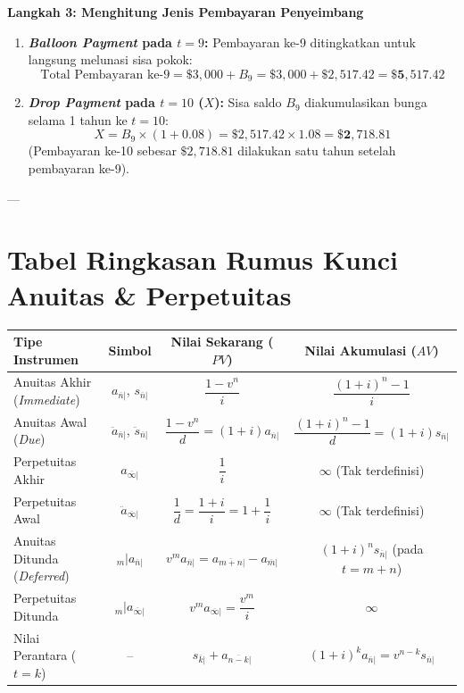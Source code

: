 \documentclass[11pt,a4paper]{article}
\begin{document}
\begin{examplebox}
\textbf{Langkah 3: Menghitung Jenis Pembayaran Penyeimbang}
\begin{enumerate}[label=(\alph*)]
    \item \textbf{\textit{Balloon Payment} pada $t = 9$:}
    Pembayaran ke-9 ditingkatkan untuk langsung melunasi sisa pokok:
    \begin{equation*}
        \text{Total Pembayaran ke-9} = \$3{,}000 + B_9 = \$3{,}000 + \$2{,}517.42 = \mathbf{\$5{,}517.42}
    \end{equation*}

    \item \textbf{\textit{Drop Payment} pada $t = 10$ ($X$):}
    Sisa saldo $B_9$ diakumulasikan bunga selama 1 tahun ke $t = 10$:
    \begin{equation*}
        X = B_9 \times (1 + 0.08) = \$2{,}517.42 \times 1.08 = \mathbf{\$2{,}718.81}
    \end{equation*}
    (Pembayaran ke-10 sebesar $\$2{,}718.81$ dilakukan satu tahun setelah pembayaran ke-9).
\end{enumerate}
\end{examplebox}

---

\section{Tabel Ringkasan Rumus Kunci Anuitas \& Perpetuitas}

\begin{center}
\small
\setlength{\tabcolsep}{4pt}
\renewcommand{\arraystretch}{1.3}
\begin{tabular}{lccc}
\toprule
\textbf{Tipe Instrumen} & \textbf{Simbol} & \textbf{Nilai Sekarang ($PV$)} & \textbf{Nilai Akumulasi ($AV$)} \\
\midrule
Anuitas Akhir (\textit{Immediate}) & $a_{\overline{n}|}$, $s_{\overline{n}|}$ & $\dfrac{1 - v^n}{i}$ & $\dfrac{(1+i)^n - 1}{i}$ \\[0.8em]
Anuitas Awal (\textit{Due}) & $\ddot{a}_{\overline{n}|}$, $\ddot{s}_{\overline{n}|}$ & $\dfrac{1 - v^n}{d} = (1+i) a_{\overline{n}|}$ & $\dfrac{(1+i)^n - 1}{d} = (1+i) s_{\overline{n}|}$ \\[0.8em]
Perpetuitas Akhir & $a_{\overline{\infty}|}$ & $\dfrac{1}{i}$ & $\infty$ (Tak terdefinisi) \\[0.8em]
Perpetuitas Awal & $\ddot{a}_{\overline{\infty}|}$ & $\dfrac{1}{d} = \dfrac{1+i}{i} = 1 + \dfrac{1}{i}$ & $\infty$ (Tak terdefinisi) \\[0.8em]
Anuitas Ditunda (\textit{Deferred}) & ${}_m| a_{\overline{n}|}$ & $v^m a_{\overline{n}|} = a_{\overline{m+n}|} - a_{\overline{m}|}$ & $(1+i)^n s_{\overline{n}|}$ (pada $t=m+n$) \\[0.8em]
Perpetuitas Ditunda & ${}_m| a_{\overline{\infty}|}$ & $v^m a_{\overline{\infty}|} = \dfrac{v^m}{i}$ & $\infty$ \\[0.8em]
Nilai Perantara ($t = k$) & -- & $s_{\overline{k}|} + a_{\overline{n-k}|}$ & $(1+i)^k a_{\overline{n}|} = v^{n-k} s_{\overline{n}|}$ \\
\bottomrule
\end{tabular}
\end{center}
\end{document}
